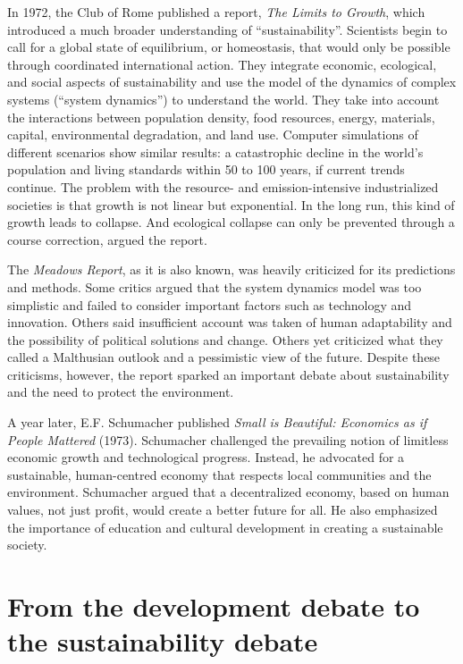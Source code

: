 \documentclass[
  a4paper,
  openany]{book}
\begin{document}
In 1972, the Club of Rome published a report, \emph{The Limits to
Growth}, which introduced a much broader understanding of
``sustainability''. Scientists begin to call for a global state of
equilibrium, or homeostasis, that would only be possible through
coordinated international action. They integrate economic, ecological,
and social aspects of sustainability and use the model of the dynamics
of complex systems (``system dynamics'') to understand the world. They
take into account the interactions between population density, food
resources, energy, materials, capital, environmental degradation, and
land use. Computer simulations of different scenarios show similar
results: a catastrophic decline in the world's population and living
standards within 50 to 100 years, if current trends continue. The
problem with the resource- and emission-intensive industrialized
societies is that growth is not linear but exponential. In the long run,
this kind of growth leads to collapse. And ecological collapse can only
be prevented through a course correction, argued the report.

The \emph{Meadows Report}, as it is also known, was heavily criticized
for its predictions and methods. Some critics argued that the system
dynamics model was too simplistic and failed to consider important
factors such as technology and innovation. Others said insufficient
account was taken of human adaptability and the possibility of political
solutions and change. Others yet criticized what they called a
Malthusian outlook and a pessimistic view of the future. Despite these
criticisms, however, the report sparked an important debate about
sustainability and the need to protect the environment.

A year later, E.F. Schumacher published \emph{Small is Beautiful:
Economics as if People Mattered} (1973). Schumacher challenged the
prevailing notion of limitless economic growth and technological
progress. Instead, he advocated for a sustainable, human-centred economy
that respects local communities and the environment. Schumacher argued
that a decentralized economy, based on human values, not just profit,
would create a better future for all. He also emphasized the importance
of education and cultural development in creating a sustainable society.

\section{From the development debate to the sustainability
debate}\label{from-the-development-debate-to-the-sustainability-debate}
\end{document}
